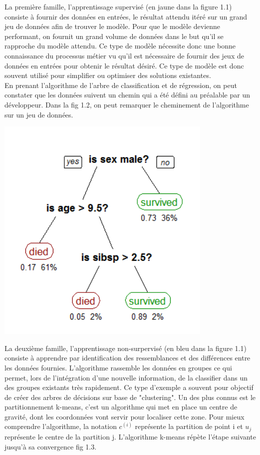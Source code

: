 \documentclass[12pt,a4paper,french]{report}
\begin{document}
La première famille, l'apprentissage supervisé (en jaune dans la figure 1.1) consiste à fournir des données en entrées, le résultat attendu itéré sur un grand jeu de données afin de trouver le modèle. Pour que le modèle devienne performant, on fournit un grand volume de données dans le but qu'il se rapproche du modèle attendu. Ce type de modèle nécessite donc une bonne connaissance du processus métier vu qu'il est nécessaire de fournir des jeux de données en entrées pour obtenir le résultat désiré. Ce type de modèle est donc souvent utilisé pour simplifier ou optimiser des solutions existantes.\\

En prenant l'algorithme de l'arbre de classification et de régression, on peut constater que les données suivent un chemin qui a été défini au préalable par un développeur. Dans la fig 1.2, on peut remarquer le cheminement de l'algorithme sur un jeu de données.

\begin{center}
	\includegraphics[scale=0.5]{ML_superviser}
	\label{fig1}
\end{center}


La deuxième famille, l'apprentissage non-surpervisé (en bleu dans la figure 1.1) consiste à apprendre par identification des ressemblances et des différences entre les données fournies. L'algorithme rassemble les données en groupes ce qui permet, lors de l'intégration d'une nouvelle information, de la classifier dans un des groupes existants très rapidement. Ce type d'exemple a souvent pour objectif de créer des arbres de décisions sur base de "clustering".
Un des plus connus est le partitionnement k-means, c'est un algorithme qui met en place un centre de gravité, dont les coordonnées vont servir pour localiser cette zone. Pour mieux comprendre l'algorithme, la notation $c^{(i)}$ représente la partition de point i et $u_j$ représente le centre de la partition j. L'algorithme k-means répète l'étape suivante jusqu'à sa convergence fig 1.3.\\
\end{document}
